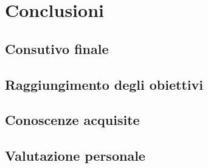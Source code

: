
\chapter{Conclusioni}
\label{cap:conclusioni}

\section{Consutivo finale}

\section{Raggiungimento degli obiettivi}

\section{Conoscenze acquisite}

\section{Valutazione personale}